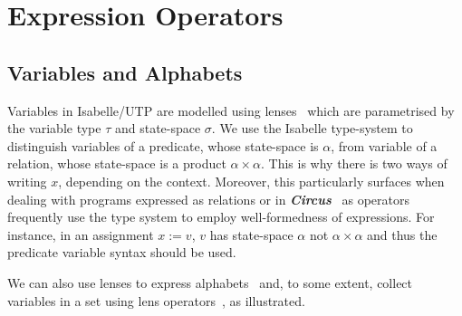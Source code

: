 \documentclass[11pt]{article}
\newcommand{\Circus}{\ckey{Circus}\xspace}
\newcommand{\ckey}[1]{\hbox{\textbf{\textsf{\textsl{#1}}}}}%
\begin{document}
\newpage

\section{Expression Operators}

\subsection{Variables and Alphabets}

Variables in Isabelle/UTP are modelled using lenses~\cite{Foster16a,Foster17a,Foster17b} which are parametrised by the
variable type $\tau$ and state-space $\sigma$.  We use the Isabelle type-system to distinguish variables of a predicate,
whose state-space is $\alpha$, from variable of a relation, whose state-space is a product $\alpha \times \alpha$. This
is why there is two ways of writing $x$, depending on the context. Moreover, this particularly surfaces when dealing
with programs expressed as relations or in \Circus~\cite{Oliveira&09} as operators frequently use the type system to
employ well-formedness of expressions. For instance, in an assignment $x := v$, $v$ has state-space $\alpha$ not
$\alpha \times \alpha$ and thus the predicate variable syntax should be used.

We can also use lenses to express alphabets~\cite{Foster17a} and, to some extent, collect variables in a set using lens
operators~\cite{Foster16a}, as illustrated.

\vspace{4ex}
\end{document}
